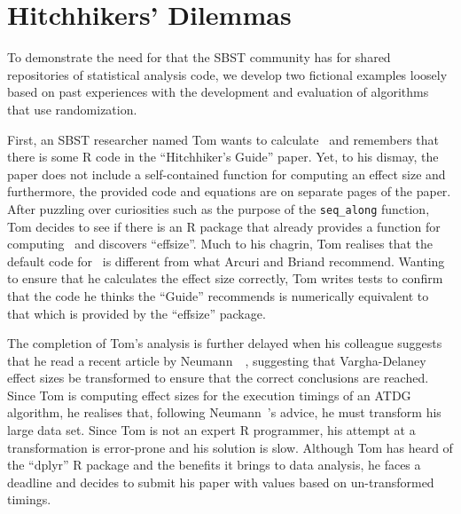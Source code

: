 
\section{Hitchhikers' Dilemmas}
\label{sec:dilemma}

To demonstrate the need for that the SBST community has for shared repositories of statistical analysis code, we develop
two fictional examples loosely based on past experiences with the development and evaluation of algorithms that use
randomization.

First, an SBST researcher named Tom wants to calculate \atwelve~and remembers that there is some R code in the
``Hitchhiker's Guide'' paper. Yet, to his dismay, the paper does not include a self-contained function for computing an
effect size and furthermore, the provided code and equations are on separate pages of the paper. After puzzling over
curiosities such as the purpose of the {\tt seq\_along} function, Tom decides to see if there is an R package that
already provides a function for computing \atwelve~and discovers ``effsize''. Much to his chagrin, Tom realises that the
default code for \atwelve~is different from what Arcuri and Briand recommend. Wanting to ensure that he calculates the
effect size correctly, Tom writes tests to confirm that the code he thinks the ``Guide'' recommends is numerically
equivalent to that which is provided by the ``effsize'' package.

The completion of Tom's analysis is further delayed when his colleague suggests that he read a recent article by
Neumann~\etal~\cite{Neumann2015}, suggesting that Vargha-Delaney effect sizes be transformed to ensure that the correct
conclusions are reached. Since Tom is computing effect sizes for the execution timings of an ATDG algorithm, he realises
that, following Neumann~\etal's advice, he must transform his large data set. Since Tom is not an expert R programmer,
his attempt at a transformation is error-prone and his solution is slow. Although Tom has heard of the ``dplyr''
R package and the benefits it brings to data analysis, he faces a deadline and decides to submit his paper with
\atwelve values based on un-transformed timings.


